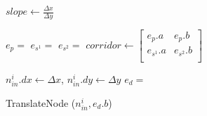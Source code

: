 \begin{algorithm}[tb!]
\begin{algorithmic}[1]
            \State $ slope \gets \frac{\Delta x}{\Delta y}$

            \State $ e_{p} = $ 
            \State $ e_{s^1} = $ 
            \State $ e_{s^2} = $ 
            \State $ corridor \gets
                \begin{bmatrix}
                    e_{p}.a &
                    e_{p}.b \\

                    e_{s^1}.a &
                    e_{s^2}.b \\
                \end{bmatrix} $

                \State $ {n}_{in}^i.dx \gets \Delta x $, $ {n}_{in}^i.dy \gets \Delta y $
                \State $ e_{d} = $ 

                \State TranslateNode ($ {n}_{in}^i, e_{d}.b $)
            \EndFor
        \EndProcedure
    \end{algorithmic}
\end{algorithm}



